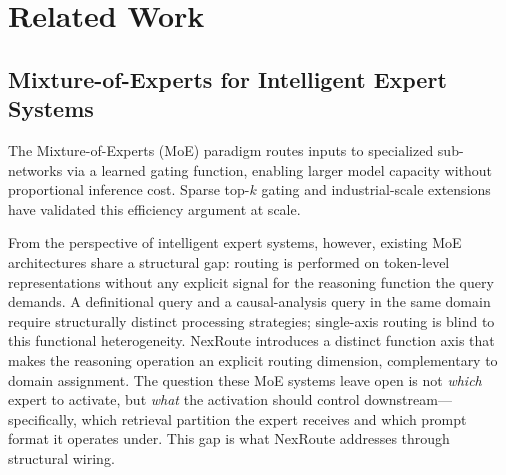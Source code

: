 \documentclass[a4paper,fleql,doubleblind]{cas-sc}
\begin{document}
\section{Related Work}
\label{sec:related}

\subsection{Mixture-of-Experts for Intelligent Expert Systems}
The Mixture-of-Experts (MoE) paradigm \citep{shazeer2017outrageously} routes
inputs to specialized sub-networks via a learned gating function, enabling
larger model capacity without proportional inference cost.
Sparse top-$k$ gating and industrial-scale extensions~\citep{fedus2022switch,jiang2024mixtral,deepseekai2025deepseekv3}
have validated this efficiency argument at scale.

From the perspective of intelligent expert systems, however, existing MoE
architectures share a structural gap: routing is performed on token-level representations
without any explicit signal for the reasoning function the query demands.
A definitional query and a causal-analysis query in the same domain require
structurally distinct processing strategies; single-axis routing is blind to
this functional heterogeneity.
NexRoute introduces a distinct function axis that makes the reasoning operation
an explicit routing dimension, complementary to domain assignment.
The question these MoE systems leave open is not \emph{which} expert to activate,
but \emph{what} the activation should control downstream---specifically,
which retrieval partition the expert receives and which prompt format it operates under.
This gap is what NexRoute addresses through structural wiring.

\end{document}
